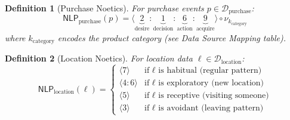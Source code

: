 \documentclass[11pt,twoside]{book}
\newcommand{\noe}[1]{\nu_{#1}}
\newcommand{\NLP}{\mathsf{NLP}}
\newcommand{\DigitalTrace}{\mathcal{D}}
\newtheorem{definition}{Definition}[chapter]
\begin{document}
\begin{definition}[Purchase Noetics]
\label{def:purchase-noetics}
For purchase events $p \in \DigitalTrace_{\text{purchase}}$:
\[
    \NLP_{\text{purchase}}(p) = \langle \underbrace{2}_{\text{desire}} : \underbrace{1}_{\text{decision}} : \underbrace{6}_{\text{action}} : \underbrace{9}_{\text{acquire}} \rangle \circ \noe{k_{\text{category}}}
\]
where $k_{\text{category}}$ encodes the product category (see Data Source Mapping table).
\end{definition}

\begin{definition}[Location Noetics]
\label{def:location-noetics}
For location data $\ell \in \DigitalTrace_{\text{location}}$:
\[
    \NLP_{\text{location}}(\ell) =
    \begin{cases}
        \langle 7 \rangle & \text{if } \ell \text{ is habitual (regular pattern)} \\
        \langle 4 : 6 \rangle & \text{if } \ell \text{ is exploratory (new location)} \\
        \langle 5 \rangle & \text{if } \ell \text{ is receptive (visiting someone)} \\
        \langle 3 \rangle & \text{if } \ell \text{ is avoidant (leaving pattern)}
    \end{cases}
\]
\end{definition}
\end{document}

